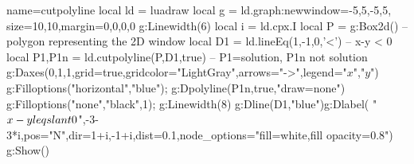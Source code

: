 \documentclass[]{standalone}
\begin{document}
\begin{luadraw}{name=cutpolyline}
local ld = luadraw
local g = ld.graph:new{window={-5,5,-5,5}, size={10,10},margin={0,0,0,0}}
g:Linewidth(6)
local i = ld.cpx.I
local P = g:Box2d() -- polygon representing the 2D window
local D1 = ld.lineEq(1,-1,0,'<') -- x-y < 0
local P1,P1n = ld.cutpolyline(P,D1,true) -- P1=solution, P1n not solution
g:Daxes({0,1,1},{grid=true,gridcolor="LightGray",arrows="->",legend={"$x$","$y$"}})
g:Filloptions("horizontal","blue"); g:Dpolyline(P1n,true,"draw=none")
g:Filloptions("none","black",1); g:Linewidth(8)
g:Dline(D1,"blue")g:Dlabel(
"$x-y\\leqslant 0$",-3-3*i,{pos="N",dir={1+i,-1+i},dist=0.1,node_options="fill=white,fill opacity=0.8"})
g:Show()
\end{luadraw}
\end{document}
